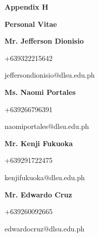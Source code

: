 %
%
%                 

\textbf{\Huge Appendix H}
\bigskip

\textbf{\LARGE Personal Vitae}

\bigskip
\textbf{Mr. Jefferson Dionisio}

+639322215642

jefferson\textunderscore dionisio$@$dlsu.edu.ph

\bigskip
\textbf{Ms. Naomi Portales}

+639266796391

naomi\textunderscore portales$@$dlsu.edu.ph

\bigskip
\textbf{Mr. Kenji Fukuoka}

+639291722475

kenji\textunderscore fukuoka$@$dlsu.edu.ph

\bigskip
\textbf{Mr. Edwardo Cruz}

+639260092665

edwardo\textunderscore cruz$@$dlsu.edu.ph
